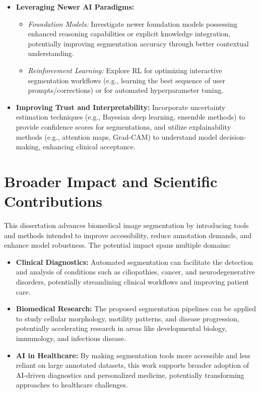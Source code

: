 \documentclass[./dissertation.tex]{subfiles}
\begin{document}
\begin{itemize}
\begin{itemize}
          \end{itemize}
    \item \textbf{Leveraging Newer AI Paradigms:}
          \begin{itemize}
              \item \textit{Foundation Models:} Investigate newer foundation models possessing enhanced reasoning capabilities or explicit knowledge integration, potentially improving segmentation accuracy through better contextual understanding. %
              \item \textit{Reinforcement Learning:} Explore RL for optimizing interactive segmentation workflows (e.g., learning the best sequence of user prompts/corrections) or for automated hyperparameter tuning. %
          \end{itemize}
    \item \textbf{Improving Trust and Interpretability:} Incorporate uncertainty estimation techniques (e.g., Bayesian deep learning, ensemble methods) to provide confidence scores for segmentations, and utilize explainability methods (e.g., attention maps, Grad-CAM) to understand model decision-making, enhancing clinical acceptance.
\end{itemize}

\section{Broader Impact and Scientific Contributions}
This dissertation advances biomedical image segmentation by introducing tools and methods intended to improve accessibility, reduce annotation demands, and enhance model robustness. The potential impact spans multiple domains:

\begin{itemize}
    \item \textbf{Clinical Diagnostics:} Automated segmentation can facilitate the detection and analysis of conditions such as ciliopathies, cancer, and neurodegenerative disorders, potentially streamlining clinical workflows and improving patient care.
    \item \textbf{Biomedical Research:} The proposed segmentation pipelines can be applied to study cellular morphology, motility patterns, and disease progression, potentially accelerating research in areas like developmental biology, immunology, and infectious disease.
    \item \textbf{AI in Healthcare:} By making segmentation tools more accessible and less reliant on large annotated datasets, this work supports broader adoption of AI-driven diagnostics and personalized medicine, potentially transforming approaches to healthcare challenges.
\end{itemize}
\end{document}
